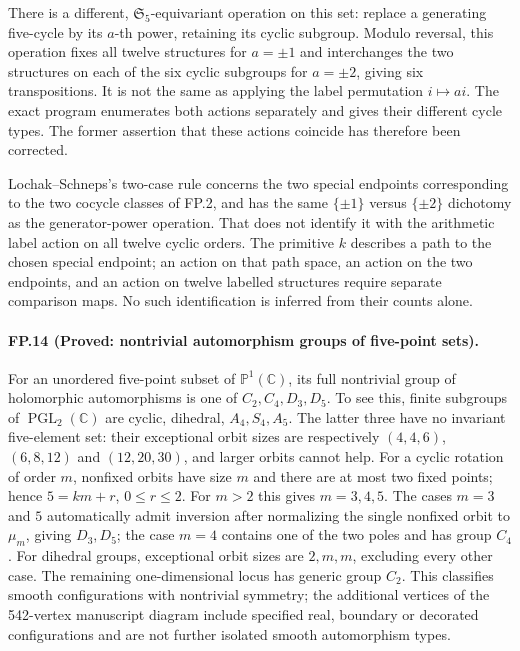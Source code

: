 There is a different, $\mathfrak S_5$-equivariant operation on this
set: replace a generating five-cycle by its $a$-th power, retaining
its cyclic subgroup. Modulo reversal, this operation fixes all twelve
structures for $a=\pm1$ and interchanges the two structures on each
of the six cyclic subgroups for $a=\pm2$, giving six transpositions.
It is not the same as applying the label permutation $i\mapsto ai$.
The exact program enumerates both actions separately and gives their
different cycle types. The former assertion that these actions coincide
has therefore been corrected.

Lochak--Schneps's two-case rule concerns the two special endpoints
corresponding to the two cocycle classes of FP.2, and has the same
$\{\pm1\}$ versus $\{\pm2\}$ dichotomy as the generator-power
operation. That does not identify it with the arithmetic label action
on all twelve cyclic orders. The primitive $k$ describes a path to
the chosen special endpoint; an action on that path space, an action
on the two endpoints, and an action on twelve labelled structures
require separate comparison maps. No such identification is inferred
from their counts alone.

\paragraph{FP.14 (Proved: nontrivial automorphism groups of five-point sets).}
For an unordered five-point subset of $\mathbb P^1(\mathbb C)$, its
full nontrivial group of holomorphic automorphisms is one of
$C_2,C_4,D_3,D_5$. To see this, finite subgroups of
$\operatorname{PGL}_2(\mathbb C)$ are cyclic, dihedral, $A_4,S_4,A_5$.
The latter three have no invariant five-element set: their exceptional
orbit sizes are respectively $(4,4,6)$, $(6,8,12)$ and $(12,20,30)$, and
larger orbits cannot help. For a cyclic rotation of order $m$, nonfixed
orbits have size $m$ and there are at most two fixed points; hence
$5=km+r$, $0\leq r\leq2$. For $m>2$ this gives $m=3,4,5$.
The cases $m=3$ and $5$ automatically admit inversion after normalizing
the single nonfixed orbit to $\mu_m$, giving $D_3,D_5$; the case $m=4$
contains one of the two poles and has group $C_4$. For dihedral groups,
exceptional orbit sizes are $2,m,m$, excluding every other case.
The remaining one-dimensional locus has generic group $C_2$.
This classifies smooth configurations with nontrivial symmetry; the
additional vertices of the 542-vertex manuscript diagram include specified
real, boundary or decorated configurations and are not further isolated
smooth automorphism types.

